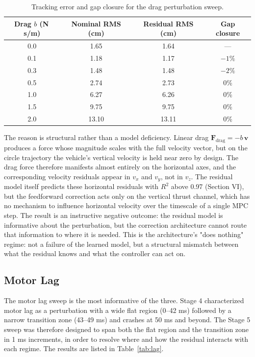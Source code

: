 \documentclass[conference]{IEEEtran}
\begin{document}
\begin{table}[t]
\centering
\caption{Tracking error and gap closure for the drag perturbation sweep.}
\label{tab:drag}
\begin{tabular}{cccc}
\toprule
Drag $b$ (N\,s/m) & Nominal RMS (cm) & Residual RMS (cm) & Gap closure \\
\midrule
0.0 & 1.65 & 1.64 & --- \\
0.1 & 1.18 & 1.17 & $-1\%$ \\
0.3 & 1.48 & 1.48 & $-2\%$ \\
0.5 & 2.74 & 2.73 & 0\% \\
1.0 & 6.27 & 6.26 & 0\% \\
1.5 & 9.75 & 9.75 & 0\% \\
2.0 & 13.10 & 13.11 & 0\% \\
\bottomrule
\end{tabular}
\end{table}

The reason is structural rather than a model deficiency. Linear drag $\mathbf{F}_{\text{drag}} = -b\, \mathbf{v}$ produces a force whose magnitude scales with the full velocity vector, but on the circle trajectory the vehicle's vertical velocity is held near zero by design. The drag force therefore manifests almost entirely on the horizontal axes, and the corresponding velocity residuals appear in $v_x$ and $v_y$, not in $v_z$. The residual model itself predicts these horizontal residuals with $R^2$ above 0.97 (Section VI), but the feedforward correction acts only on the vertical thrust channel, which has no mechanism to influence horizontal velocity over the timescale of a single MPC step. The result is an instructive negative outcome: the residual model is informative about the perturbation, but the correction architecture cannot route that information to where it is needed. This is the architecture's "does nothing" regime: not a failure of the learned model, but a structural mismatch between what the residual knows and what the controller can act on.

\subsection{Motor Lag}
The motor lag sweep is the most informative of the three. Stage 4 characterized motor lag as a perturbation with a wide flat region (0--42 ms) followed by a narrow transition zone (43--49 ms) and crashes at 50 ms and beyond. The Stage 5 sweep was therefore designed to span both the flat region and the transition zone in 1 ms increments, in order to resolve where and how the residual interacts with each regime. The results are listed in Table~\ref{tab:lag}.
\end{document}

